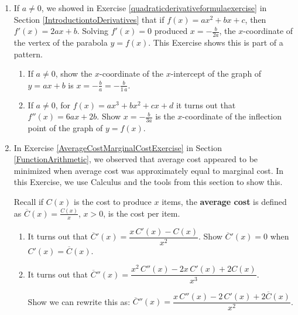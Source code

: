 \begin{enumerate}
\setcounter{enumi}{\value{HW}}

\item If $a \neq 0$, we showed in Exercise \ref{quadraticderivativeformulaexercise} in Section \ref{IntroductiontoDerivatives} that if $f(x) = ax^2 + bx + c$, then $f'(x) = 2ax + b$. Solving $f'(x) = 0$ produced $x = -\frac{b}{2a}$, the $x$-coordinate of the vertex of the parabola $y = f(x)$. This Exercise shows this is part of a pattern.

\begin{enumerate}  \item  If $a \neq 0$, show the $x$-coordinate of the $x$-intercept of the graph of $y = ax + b$ is $x = -\frac{b}{a} = -\frac{b}{1 \, a}$.

\item  If $a \neq 0$, for $f(x) = ax^3 + bx^2 + cx + d$ it turns out that $f''(x) = 6ax + 2b$.  Show $x = -\frac{b}{3a}$ is the $x$-coordinate of the inflection point of the graph of $y = f(x)$.

\end{enumerate}

\item\label{MinimizeAverageCostProofExercise}  In Exercise \ref{AverageCostMarginalCostExercise} in Section \ref{FunctionArithmetic}, we observed that average cost appeared to be minimized when average cost was approximately equal to marginal cost.  In this Exercise, we use Calculus and the tools from this section to show this. 

\smallskip

 Recall if $C(x)$ is the cost to produce $x$ items, the \textbf{average cost} is defined as $\overline{C}(x) = \frac{C(x)}{x}$, $x > 0$,  is the cost per item. 
\begin{enumerate}

\item\label{avgcostcostderivequal}  It turns out that $\overline{C}'(x) = \dfrac{x \, C'(x) - C(x)}{x^2}$.  Show  $\overline{C}'(x) = 0$ when $C'(x) = \overline{C}(x)$.

\smallskip

\item  It turns out that $\overline{C}''(x) = \dfrac{x^2 \, C''(x) - 2x\, C'(x) + 2C(x)}{x^3}$. 

\smallskip

Show we can rewrite this as: $\overline{C}''(x) = \dfrac{x \, C''(x) - 2\, C'(x) + 2 \overline{C}(x)}{x^2}$.


\end{enumerate}
\end{enumerate}
